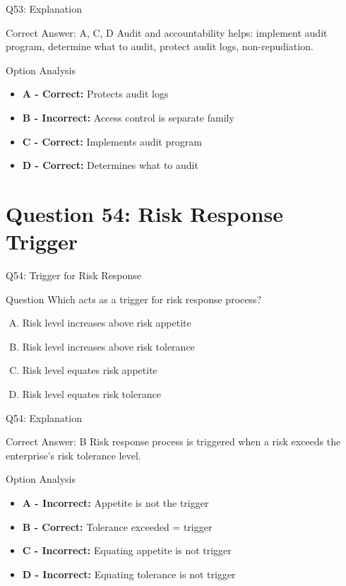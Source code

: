 \documentclass{beamer}
\begin{document}
	\begin{frame}{Q53: Explanation}
		\begin{block}{Correct Answer: A, C, D}
			Audit and accountability helps: implement audit program, determine what to audit, protect audit logs, non-repudiation.
		\end{block}
		\begin{block}{Option Analysis}
			\begin{itemize}
				\item \textbf{A - Correct:} Protects audit logs
				\item \textbf{B - Incorrect:} Access control is separate family
				\item \textbf{C - Correct:} Implements audit program
				\item \textbf{D - Correct:} Determines what to audit
			\end{itemize}
		\end{block}
	\end{frame}
	
	\section{Question 54: Risk Response Trigger}
	
	\begin{frame}{Q54: Trigger for Risk Response}
		\begin{block}{Question}
			Which acts as a trigger for risk response process?
		\end{block}
		\begin{enumerate}[(A)]
			\item Risk level increases above risk appetite
			\item Risk level increases above risk tolerance
			\item Risk level equates risk appetite
			\item Risk level equates risk tolerance
		\end{enumerate}
	\end{frame}
	
	\begin{frame}{Q54: Explanation}
		\begin{block}{Correct Answer: B}
			Risk response process is triggered when a risk exceeds the enterprise's risk tolerance level.
		\end{block}
		\begin{block}{Option Analysis}
			\begin{itemize}
				\item \textbf{A - Incorrect:} Appetite is not the trigger
				\item \textbf{B - Correct:} Tolerance exceeded = trigger
				\item \textbf{C - Incorrect:} Equating appetite is not trigger
				\item \textbf{D - Incorrect:} Equating tolerance is not trigger
			\end{itemize}
		\end{block}
	\end{frame}
	
\end{document}
